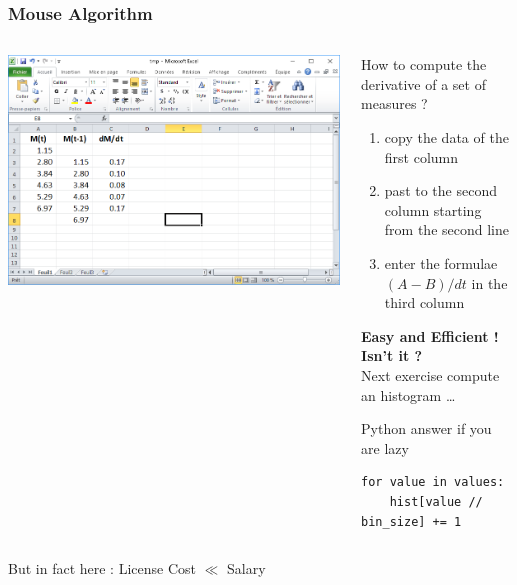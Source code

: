 \begin{frame}[fragile]
  \frametitle{Mouse Algorithm}
  \begin{columns}[T]
    \begin{column}{.4\textwidth}
      \includegraphics[width=1.\textwidth]{images/excel-sheet.png}
    \end{column}
    \begin{column}{.6\textwidth}
      \small
      How to compute the derivative of a set of measures ?
      \begin{enumerate}
      \item copy the data of the first column
      \item past to the second column starting from the second line
      \item enter the formulae $(A-B)/dt$ in the third column
      \end{enumerate}
      \textbf{Easy and Efficient ! Isn't it ? } \\[1em]
      Next exercise compute an histogram \ldots \\[1em]
      {\tiny Python answer if you are lazy
\begin{Verbatim}
for value in values:
    hist[value // bin_size] += 1
\end{Verbatim}
        }%
    \end{column}
  \end{columns}
  \vspace{3em}
  \centerline{\alert{But in fact here : License Cost $\ll$ Salary}}
\end{frame}

